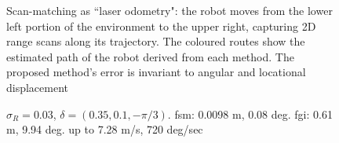 \begin{figure}[]\centering
  
  \vspace{-2cm}
  \caption{\small Scan-matching as ``laser odometry": the robot moves from the
           lower left portion of the environment to the upper right, capturing
           2D range scans along its trajectory. The coloured routes show the
           estimated path of the robot derived from each method. The proposed
           method's error is invariant to angular and locational displacement}
  \label{}
\end{figure}

\begin{figure}[]\centering
  
  \caption{$\sigma_R = 0.03$, $\delta = (0.35, 0.1, -\pi/3)$. fsm: 0.0098 m, 0.08 deg.
  fgi: 0.61 m, 9.94 deg. up to 7.28 m/s, 720 deg/sec}
  \label{}
\end{figure}
